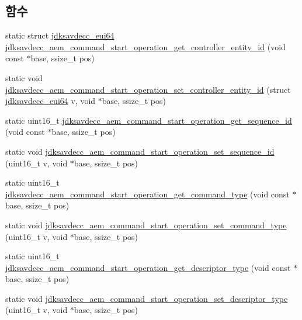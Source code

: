 \subsection*{함수}
\begin{DoxyCompactItemize}
\item 
static struct \hyperlink{structjdksavdecc__eui64}{jdksavdecc\+\_\+eui64} \hyperlink{group__command__start__operation_gab93f259b034934b890bc6aa68b755b14}{jdksavdecc\+\_\+aem\+\_\+command\+\_\+start\+\_\+operation\+\_\+get\+\_\+controller\+\_\+entity\+\_\+id} (void const $\ast$base, ssize\+\_\+t pos)
\item 
static void \hyperlink{group__command__start__operation_ga5c93ccdd70b0a0ca03538b64b81a280f}{jdksavdecc\+\_\+aem\+\_\+command\+\_\+start\+\_\+operation\+\_\+set\+\_\+controller\+\_\+entity\+\_\+id} (struct \hyperlink{structjdksavdecc__eui64}{jdksavdecc\+\_\+eui64} v, void $\ast$base, ssize\+\_\+t pos)
\item 
static uint16\+\_\+t \hyperlink{group__command__start__operation_ga0b0a5fc6350dd64a272427f49719bcce}{jdksavdecc\+\_\+aem\+\_\+command\+\_\+start\+\_\+operation\+\_\+get\+\_\+sequence\+\_\+id} (void const $\ast$base, ssize\+\_\+t pos)
\item 
static void \hyperlink{group__command__start__operation_ga05224fedd2c27a882e876d0d129fd515}{jdksavdecc\+\_\+aem\+\_\+command\+\_\+start\+\_\+operation\+\_\+set\+\_\+sequence\+\_\+id} (uint16\+\_\+t v, void $\ast$base, ssize\+\_\+t pos)
\item 
static uint16\+\_\+t \hyperlink{group__command__start__operation_gaa9ebead0edc47616e0176c99815b9d05}{jdksavdecc\+\_\+aem\+\_\+command\+\_\+start\+\_\+operation\+\_\+get\+\_\+command\+\_\+type} (void const $\ast$base, ssize\+\_\+t pos)
\item 
static void \hyperlink{group__command__start__operation_ga8db2676d3c5fb6207ac1c7511523ce91}{jdksavdecc\+\_\+aem\+\_\+command\+\_\+start\+\_\+operation\+\_\+set\+\_\+command\+\_\+type} (uint16\+\_\+t v, void $\ast$base, ssize\+\_\+t pos)
\item 
static uint16\+\_\+t \hyperlink{group__command__start__operation_ga276a63f8443860145441878d5e726b7b}{jdksavdecc\+\_\+aem\+\_\+command\+\_\+start\+\_\+operation\+\_\+get\+\_\+descriptor\+\_\+type} (void const $\ast$base, ssize\+\_\+t pos)
\item 
static void \hyperlink{group__command__start__operation_gaee59238787b331c4fa0df198cf9d3b5c}{jdksavdecc\+\_\+aem\+\_\+command\+\_\+start\+\_\+operation\+\_\+set\+\_\+descriptor\+\_\+type} (uint16\+\_\+t v, void $\ast$base, ssize\+\_\+t pos)

\end{DoxyCompactItemize}
